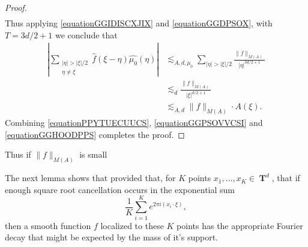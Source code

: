 \documentclass[12pt,reqno]{article}
\numberwithin{equation}{section}
\DeclareMathOperator{\TT}{\mathbf{T}}
\begin{document}
\begin{proof}
\begin{equation}
\begin{split}
    \end{split}
    \end{equation}
    Thus applying \eqref{equationGGIDISCXJIX} and \eqref{equationGGDPSOX}, with $T = 3d/2 + 1$ we conclude that
    \begin{equation} \label{equationGGHOODPPS}
    \begin{split}
        \left| \sum_{\substack{|\eta| > |\xi|/2\\ \eta \neq \xi}} \widehat{f}(\xi - \eta) \widehat{\mu_0}(\eta) \right| &\lesssim_{A,d,\mu_0} \sum_{|\eta| > |\xi|/2} \frac{\| f \|_{M(A)}}{|\eta|^{3d/2+1}}\\
        &\lesssim_d \frac{\| f \|_{M(A)}}{|\xi|^{d/2 + 1}}\\
        &\lesssim_{A,d} \| f \|_{M(A)} \cdot A(\xi). 
    \end{split}
    \end{equation}
    Combining \eqref{equationPPYTUECUUCS}, \eqref{equationGGPSOVVCSI} and \eqref{equationGGHOODPPS} completes the proof.
\end{proof}

Thus if $\| f \|_{M(A)}$ is small

The next lemma shows that provided that, for $K$ points $x_1, \dots, x_K \in \TT^d$, that if enough square root cancellation occurs in the exponential sum
%
\[ \frac{1}{K} \sum_{i = 1}^K e^{2 \pi i (x_i \cdot \xi)}, \]
%
then a smooth function $f$ localized to these $K$ points has the appropriate Fourier decay that might be expected by the mass of it's support.
\end{document}
